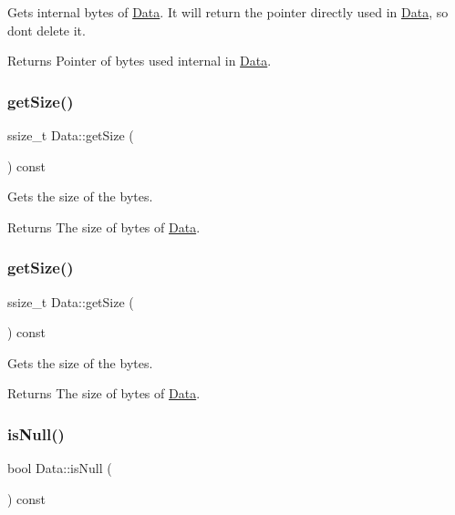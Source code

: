 Gets internal bytes of \hyperlink{classData}{Data}. It will return the pointer directly used in \hyperlink{classData}{Data}, so don\textquotesingle{}t delete it.

\begin{DoxyReturn}{Returns}
Pointer of bytes used internal in \hyperlink{classData}{Data}. 
\end{DoxyReturn}
\mbox{\label{classData_adb810cfcdcb6c3da22ac05a4c023445d}} 
\subsubsection{\texorpdfstring{get\+Size()}{getSize()}\hspace{0.1cm}{\footnotesize\ttfamily [1/2]}}
{\footnotesize\ttfamily ssize\+\_\+t Data\+::get\+Size (\begin{DoxyParamCaption}{ }\end{DoxyParamCaption}) const}

Gets the size of the bytes.

\begin{DoxyReturn}{Returns}
The size of bytes of \hyperlink{classData}{Data}. 
\end{DoxyReturn}
\mbox{\label{classData_adb810cfcdcb6c3da22ac05a4c023445d}} 
\subsubsection{\texorpdfstring{get\+Size()}{getSize()}\hspace{0.1cm}{\footnotesize\ttfamily [2/2]}}
{\footnotesize\ttfamily ssize\+\_\+t Data\+::get\+Size (\begin{DoxyParamCaption}{ }\end{DoxyParamCaption}) const}

Gets the size of the bytes.

\begin{DoxyReturn}{Returns}
The size of bytes of \hyperlink{classData}{Data}. 
\end{DoxyReturn}
\mbox{\label{classData_af0c867ee0a1b0916ce50e9966cd252ef}} 
\subsubsection{\texorpdfstring{is\+Null()}{isNull()}\hspace{0.1cm}{\footnotesize\ttfamily [1/2]}}
{\footnotesize\ttfamily bool Data\+::is\+Null (\begin{DoxyParamCaption}{ }\end{DoxyParamCaption}) const}

